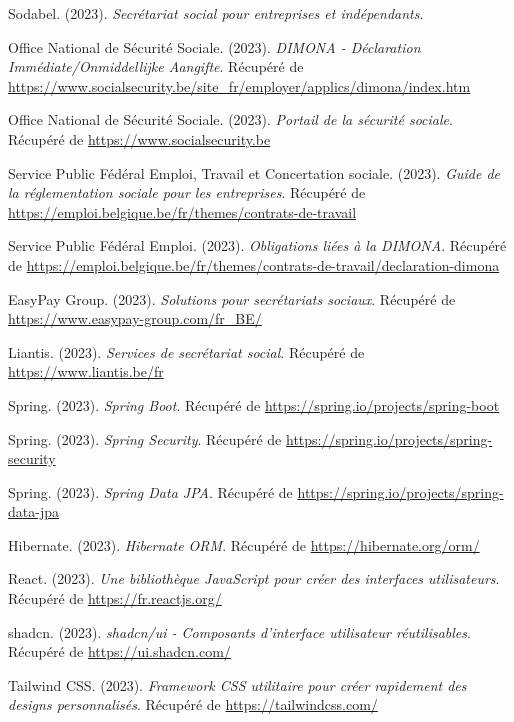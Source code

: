 \begin{thebibliography}{99}

Sodabel. (2023).
\textit{Secrétariat social pour entreprises et indépendants}.

Office National de Sécurité Sociale. (2023).
\textit{DIMONA - Déclaration Immédiate/Onmiddellijke Aangifte}.
Récupéré de \url{https://www.socialsecurity.be/site_fr/employer/applics/dimona/index.htm}

Office National de Sécurité Sociale. (2023).
\textit{Portail de la sécurité sociale}.
Récupéré de \url{https://www.socialsecurity.be}

Service Public Fédéral Emploi, Travail et Concertation sociale. (2023).
\textit{Guide de la réglementation sociale pour les entreprises}.
Récupéré de \url{https://emploi.belgique.be/fr/themes/contrats-de-travail}

Service Public Fédéral Emploi. (2023).
\textit{Obligations liées à la DIMONA}.
Récupéré de \url{https://emploi.belgique.be/fr/themes/contrats-de-travail/declaration-dimona}

EasyPay Group. (2023).
\textit{Solutions pour secrétariats sociaux}.
Récupéré de \url{https://www.easypay-group.com/fr_BE/}

Liantis. (2023).
\textit{Services de secrétariat social}.
Récupéré de \url{https://www.liantis.be/fr}

Spring. (2023).
\textit{Spring Boot}.
Récupéré de \url{https://spring.io/projects/spring-boot}

Spring. (2023).
\textit{Spring Security}.
Récupéré de \url{https://spring.io/projects/spring-security}

Spring. (2023).
\textit{Spring Data JPA}.
Récupéré de \url{https://spring.io/projects/spring-data-jpa}

Hibernate. (2023).
\textit{Hibernate ORM}.
Récupéré de \url{https://hibernate.org/orm/}

React. (2023).
\textit{Une bibliothèque JavaScript pour créer des interfaces utilisateurs}.
Récupéré de \url{https://fr.reactjs.org/}

shadcn. (2023).
\textit{shadcn/ui - Composants d'interface utilisateur réutilisables}.
Récupéré de \url{https://ui.shadcn.com/}

Tailwind CSS. (2023).
\textit{Framework CSS utilitaire pour créer rapidement des designs personnalisés}.
Récupéré de \url{https://tailwindcss.com/}


\end{thebibliography}
